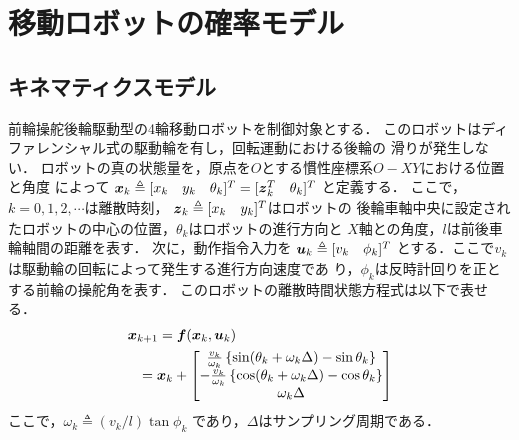 \documentclass[a4paper,10pt,twocolumn,fleqn]{jsarticle}
\def\vec#1{\mbox{\boldmath$#1$}}
\def\vec#1{\mbox{\boldmath$#1$}}
\begin{document}
%
\vspace{-5mm}
\section{移動ロボットの確率モデル\label{sec:model}}
\vspace{-2mm}
\subsection{キネマティクスモデル}
\vspace{-2mm}
前輪操舵後輪駆動型の4輪移動ロボットを制御対象とする．
%
このロボットはディファレンシャル式の駆動輪を有し，回転運動における後輪の
滑りが発生しない．
%
ロボットの真の状態量を，原点を$O$とする慣性座標系$O-XY$における位置と角度
によって
$
 \vec{x}_k\triangleq
   [ \begin{matrix} x_k& y_k&\theta_k \end{matrix} ]^T 
   =[ \begin{matrix} \vec{z}^T_k& \theta_k \end{matrix} ]^T 
$
と定義する．
ここで，$k=0,1,2,\cdots$は離散時刻，
$\vec{z}_k\triangleq[\begin{matrix}x_k& y_k \end{matrix}]^T$はロボットの
後輪車軸中央に設定されたロボットの中心の位置，$\theta_k$はロボットの進行方向と
$X$軸との角度，$l$は前後車輪軸間の距離を表す．
%
次に，動作指令入力を
$
 \vec{u}_k \triangleq
 [ \begin{matrix} v_k& \phi_k \end{matrix} ]^T
$
とする．ここで$v_k$は駆動輪の回転によって発生する進行方向速度であ
り，$\phi_k$は反時計回りを正とする前輪の操舵角を表す．
%
このロボットの離散時間状態方程式は以下で表せる\cite{p-robo}．
\begin{align}
 \vec{x}_{k+1}
 &=\vec{f}(\vec{x}_{k},\vec{u}_{k})\nonumber\\
 &\hspace{-5mm}=\vec{x}_{k}+\left[
  \begin{matrix}
   \frac{v_k}{\omega_k}\left\{\sin(\theta_{k}+\omega_k\Delta)
   -\sin\theta_{k}\right\}\\
   -\frac{v_k}{\omega_k}\left\{\cos(\theta_{k}+\omega_k\Delta)
   -\cos\theta_{k}\right\}\\
   \omega_k\Delta
  \end{matrix}
  \right] 
 \label{eq:state}
\end{align}
ここで，$ \omega_k\triangleq (v_k/l)\tan\phi_k$
であり，$\Delta$はサンプリング周期である．
\vspace{-5mm}
\end{document}
